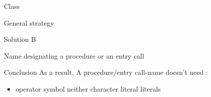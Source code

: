 \documentclass[a4paper]{prjdoc}
\begin{document}
\begin{asection}{Class }
\begin{asection}{General strategy}
\begin{asection}{Solution B}
\begin{asection}{Name designating a procedure or an entry call}
\begin{asection}{Conclusion}
              As a result, A procedure/entry call-name doesn't need :
                   \begin{itemize}
                   \item operator symbol neither character literal literals
                   \end{itemize}
                   
              \end{asection}          
              
           \end{asection} %

        \end{asection} %

     \end{asection} %
  
  \end{asection} %
  
\end{document}
